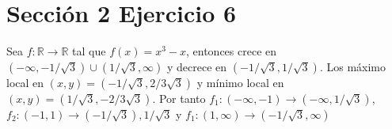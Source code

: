 \documentclass{article}
\begin{document}
\section{Sección 2 Ejercicio 6}

Sea \(f:\mathbb{R}\longrightarrow \mathbb{R}\) tal que \(f(x)=x^3-x\), entonces crece en \((-\infty,-1/\sqrt{3} )\cup (1/\sqrt{3},\infty)\) y decrece en \((-1/\sqrt{3},1/\sqrt{3})\). Los máximo local en \((x,y)=(-1/\sqrt{3},2/3\sqrt{3})\) y mínimo local en \((x,y)=(1/\sqrt{3},-2/3\sqrt{3})\). Por tanto \( f_1: (-\infty, -1) \longrightarrow (-\infty, 1/\sqrt{3})\), \( f_2: (-1, 1) \longrightarrow (-1/\sqrt{3}),1/\sqrt{3}\) y \( f_1: (1,\infty) \longrightarrow (-1/\sqrt{3},\infty)\)

%
%
\end{document}
